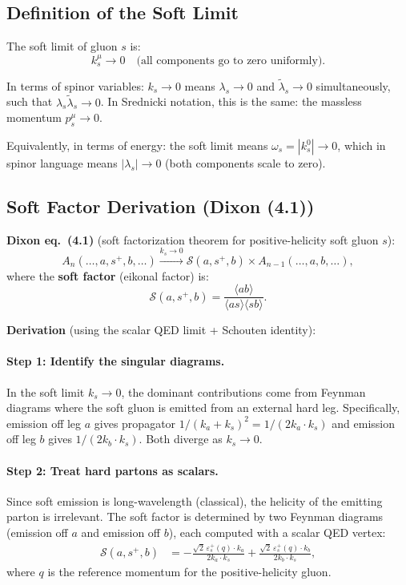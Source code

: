 \subsection{Definition of the Soft Limit}

The soft limit of gluon $s$ is:
\begin{equation}
  k_s^\mu \to 0 \quad\text{(all components go to zero uniformly)}.
\end{equation}

In terms of spinor variables: $k_s\to 0$ means $\lambda_s\to 0$ and $\tilde\lambda_s\to 0$
simultaneously, such that $\lambda_s\tilde\lambda_s\to 0$. In Srednicki notation, this is
the same: the massless momentum $p_s^\mu\to 0$.

Equivalently, in terms of energy: the soft limit means $\omega_s=|k_s^0|\to 0$, which
in spinor language means $|\lambda_s|\to 0$ (both components scale to zero).

\subsection{Soft Factor Derivation (Dixon (4.1))}

\textbf{Dixon eq.~(4.1)} (soft factorization theorem for positive-helicity soft gluon $s$):
\begin{equation}
  A_n(\ldots, a, s^+, b, \ldots) \xrightarrow{k_s\to 0}
  \mathcal{S}(a, s^+, b)\times A_{n-1}(\ldots, a, b, \ldots),
  \tag{Dixon 4.1}
\end{equation}
where the \textbf{soft factor} (eikonal factor) is:
\begin{equation}
  \mathcal{S}(a, s^+, b) = \frac{\langle ab\rangle}{\langle as\rangle\langle sb\rangle}.
  \tag{Dixon 4.2}
\end{equation}

\textbf{Derivation} (using the scalar QED limit + Schouten identity):

\paragraph{Step 1: Identify the singular diagrams.}
In the soft limit $k_s\to 0$, the dominant contributions come from Feynman diagrams
where the soft gluon is emitted from an external hard leg.
Specifically, emission off leg $a$ gives propagator $1/(k_a+k_s)^2=1/(2k_a\cdot k_s)$
and emission off leg $b$ gives $1/(2k_b\cdot k_s)$. Both diverge as $k_s\to 0$.

\paragraph{Step 2: Treat hard partons as scalars.}
Since soft emission is long-wavelength (classical), the helicity of the emitting parton
is irrelevant. The soft factor is determined by two Feynman diagrams (emission off $a$
and emission off $b$), each computed with a scalar QED vertex:
\begin{align}
  \mathcal{S}(a,s^+,b)
  &= -\frac{\sqrt{2}\,\varepsilon_s^+(q)\cdot k_a}{2k_a\cdot k_s}
   + \frac{\sqrt{2}\,\varepsilon_s^+(q)\cdot k_b}{2k_b\cdot k_s},
  \label{eq:eikonal-raw}
\end{align}
where $q$ is the reference momentum for the positive-helicity gluon.


